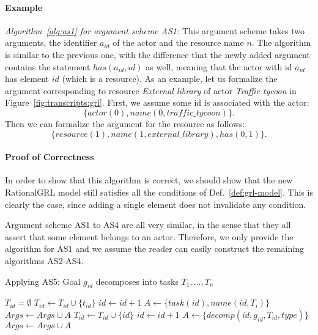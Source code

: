 \paragraph{Example} \emph{Algorithm~\ref{alg:as1} for argument scheme AS1:} This argument scheme takes two arguments, the identifier $a_{id}$ of the actor and the resource name $n$. The algorithm is similar to the previous one, with the difference that the newly added argument contains the statement $has(a_{id},id)$ as well, meaning that the actor with id $a_{id}$ has element $id$ (which is a resource). As an example, let us formalize the argument corresponding to resource \emph{External library} of actor \emph{Traffic tycoon} in Figure~\ref{fig:transcripts:grl}. First, we assume some id is associated with the actor: $$\{actor(0),name(0,traffic\_tycoon)\}.$$ Then we can formalize the argument for the resource as follows: $$\{resource(1),name(1,external\_library),has(0,1)\}.$$

\paragraph{Proof of Correctness} In order to show that this algorithm is correct, we should show that the new RationalGRL model still satisfies all the conditions of Def.~\ref{def:grl-model}. This is clearly the case, since adding a single element does not invalidate any condition.

Argument scheme AS1 to AS4 are all very similar, in the sense that they all assert that some element belongs to an actor. Therefore, we only provide the algorithm for AS1 and we assume the reader can easily construct the remaining algorithms AS2-AS4.

\begin{algorithm}[h]
  \caption{Applying AS5: Goal $g_{id}$ decomposes into tasks $T_1,\ldots,T_n$}\label{alg:as5}
  \begin{algorithmic}[1]
    \State $T_{id} = \emptyset$\label{alg:as5:1}
        \State $T_{id} \gets T_{id} \cup \{t_{id}\}$
      \Else\label{alg:as5:3}
        \State $id\gets id+1$
        \State $A \gets \{task(id),name(id,T_i)\}$
        \State $Args \gets Args\cup A$
        \State $T_{id} \gets T_{id} \cup \{id\}$
      \EndIf
    \EndFor
    \State $id\gets id+1$\label{alg:as5:4}
    \State $A\gets \{decomp(id, g_{id}, T_{id}, type)\}$
    \State $Args \gets Args\cup A$
    \EndProcedure
  \end{algorithmic}
\end{algorithm}

